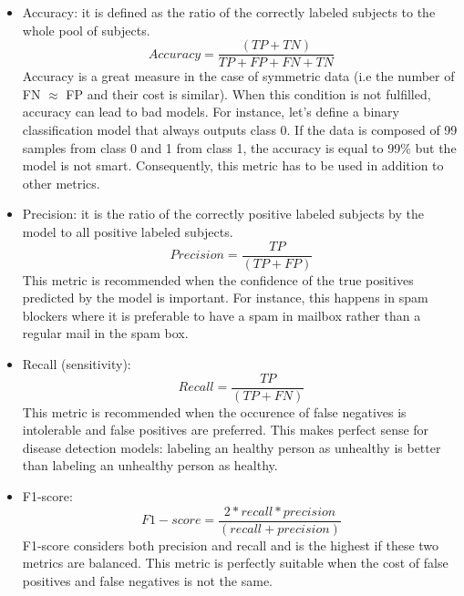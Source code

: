 \begin{itemize}
\item Accuracy: it is defined as the ratio of the correctly labeled subjects to the whole pool of subjects.
\begin{equation}
Accuracy = \frac{(TP+TN)}{TP+FP+FN+TN}
\end{equation}
Accuracy is a great measure in the case of symmetric data (i.e the number of FN $\approx$ FP and their cost is similar). When this condition is not fulfilled, accuracy can lead to bad models. For instance, let's define a binary classification model that always outputs class 0. If the data is composed of 99 samples from class 0 and 1 from class 1, the accuracy is equal to 99\% but the model is not smart. Consequently, this metric has to be used in addition to other metrics.

\item Precision: it is the ratio of the correctly positive labeled subjects by the model to all positive labeled subjects.
\begin{equation}
Precision = \frac{TP}{(TP + FP)}
\end{equation}
This metric is recommended when the confidence of the true positives predicted by the model is important. For instance, this happens in spam blockers where it is preferable to have a spam in mailbox rather than a regular mail in the spam box.

\item Recall (sensitivity):
\begin{equation}
Recall = \frac{TP}{(TP + FN)}
\end{equation}
This metric is recommended when the occurence of false negatives is intolerable and false positives are preferred. This makes perfect sense for disease detection models: labeling an healthy person as unhealthy is better than labeling an unhealthy person as healthy.

\item F1-score:
\begin{equation}
F1-score = \frac{2* recall * precision}{(recall + precision)}
\end{equation}
F1-score considers both precision and recall and is the highest if these two metrics are balanced. This metric is perfectly suitable when the cost of false positives and false negatives is not the same.


\end{itemize}
